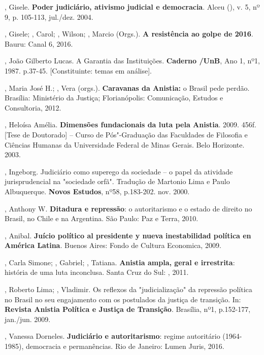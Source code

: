 , Gisele. \textbf{Poder judiciário, ativismo judicial e
democracia}. Alceu (), v. 5, nº 9, p. 105-113, jul./dez. 2004.

, Gisele; , Carol;  , Wilson; , Marcio
(Orgs.). \textbf{A resistência ao golpe de 2016}. Bauru: Canal 6, 2016.

, João Gilberto Lucas. A Garantia das Instituições.
\textbf{Caderno /UnB}, Ano 1, nº1, 1987. p.37-45. {[}Constituinte:
temas em análise{]}.

, Maria José H.; , Vera (orgs.). \textbf{Caravanas da
Anistia:} o Brasil pede perdão. Brasília: Ministério da Justiça;
Florianópolis: Comunicação, Estudos e Consultoria, 2012.

, Heloísa Amélia. \textbf{Dimensões fundacionais da luta pela
Anistia}. 2009. 456f. {[}Tese de Doutorado{]} -- Curso de Pós"-Graduação
das Faculdades de Filosofia e Ciências Humanas da Universidade Federal
de Minas Gerais. Belo Horizonte. 2003.

, Ingeborg. Judiciário como superego da sociedade -- o papel da
atividade jurisprudencial na "sociedade orfã". Tradução de Martonio Lima
e Paulo Albuquerque. \textbf{Novos Estudos}, nº58, p.183-202. nov. 2000.

, Anthony W. \textbf{Ditadura e repressão}: o autoritarismo e o
estado de direito no Brasil, no Chile e na Argentina. São Paulo: Paz e
Terra, 2010.

, Anibal. \textbf{Juício político al presidente y nueva
inestabilidad política en América Latina}. Buenos Aires: Fondo de
Cultura Economica, 2009.

, Carla Simone; , Gabriel; , Tatiana.
\textbf{Anistia ampla, geral e irrestrita}: história de uma luta
inconclusa. Santa Cruz do Sul: , 2011.

, Roberto Lima;  , Vladimir. Os reflexos da
"judicialização" da repressão política no Brasil no seu engajamento com
os postulados da justiça de transição. In: \textbf{Revista Anistia
Política e Justiça de Transição}. Brasília, nº1, p.152-177, jan./jun.
2009.

, Vanessa Dorneles. \textbf{Judiciário e autoritarismo}: regime
autoritário (1964-1985), democracia e permanências. Rio de Janeiro:
Lumen Juris, 2016.

